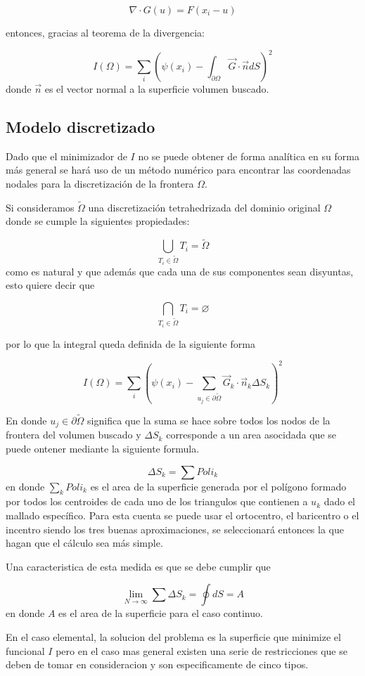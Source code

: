 $$\nabla \cdot G(u) =F(x_i-u)$$

entonces, gracias al teorema de la divergencia:

$$I(\Omega) = \sum_i(\psi(x_i) - \int_{\partial \Omega} \vec{G} \cdot \vec{n} dS)^2$$ donde $\vec{n}$ es el vector
normal a la superficie volumen buscado.

\subsection{Modelo discretizado}
Dado que el minimizador de $I$ no se puede obtener de forma analítica
en su forma más general se hará uso de un método numérico
para encontrar las coordenadas nodales para la discretización de la
frontera $\Omega$.

Si consideramos $\tilde \Omega$ una discretización tetrahedrizada del
dominio original $\Omega$ donde se cumple la siguientes propiedades:

$$\bigcup_{T_i \in \tilde{\Omega}} T_i =  \tilde{\Omega}$$
como es natural y que además que cada una de sus componentes sean
disyuntas, esto quiere decir que 

$$\bigcap_{T_i \in \tilde{\Omega}} T_i = \varnothing$$

por lo que la integral queda definida de la siguiente forma 

$$I(\Omega) = \sum_i(\psi(x_i) - \sum_{u_j \in \partial \tilde
  \Omega}\vec{G}_k \cdot\vec{n}_k \Delta
S_k)^2$$

En donde $u_j \in \partial \tilde \Omega$ significa que la suma se
hace sobre todos los nodos de la frontera del volumen buscado y
$\Delta S_k$ corresponde a un area asocidada que se puede ontener
mediante la siguiente formula.

$$\Delta S_k = \sum Poli_k$$ en donde $\sum_k Poli_k$ es el area de la
superficie generada por el polígono formado por todos los centroides
de cada uno de los triangulos que contienen a $u_k$ dado el mallado
específico. Para esta cuenta se puede usar el ortocentro, el
baricentro o el incentro siendo los tres buenas aproximaciones, se
seleccionará entonces la que hagan que el cálculo sea más simple.

Una caracteristica de esta medida es que se debe cumplir que

$$\lim_{N\to\infty} \sum \Delta S_k = \oint dS = A $$ en donde $A$ es el
area de la superficie para el caso continuo.

En el caso elemental, la solucion del problema es la superficie que minimize el funcional $I$ pero en el caso mas general existen una serie de restricciones que se deben de tomar en consideracion y son especificamente de cinco tipos.


